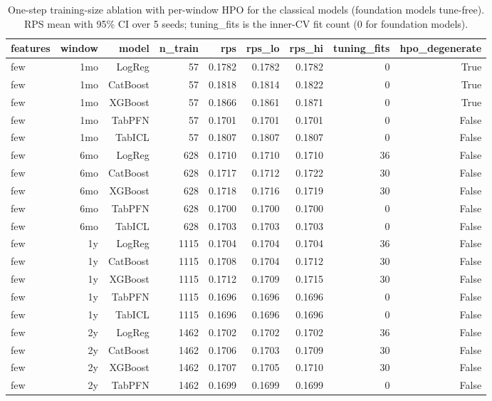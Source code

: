 \begin{table}[t]
  \centering
  \caption{One-step training-size ablation with per-window HPO for the classical models (foundation models tune-free). RPS mean with 95\% CI over 5 seeds; tuning\_fits is the inner-CV fit count (0 for foundation models).}
  \label{tab:ablation_onestep}
  \begin{tabular}{lrrrrrrrr}
  \toprule
  features & window & model & n\_train & rps & rps\_lo & rps\_hi & tuning\_fits & hpo\_degenerate \\
  \midrule
  few & 1mo & LogReg & 57 & 0.1782 & 0.1782 & 0.1782 & 0 & True \\
  few & 1mo & CatBoost & 57 & 0.1818 & 0.1814 & 0.1822 & 0 & True \\
  few & 1mo & XGBoost & 57 & 0.1866 & 0.1861 & 0.1871 & 0 & True \\
  few & 1mo & TabPFN & 57 & 0.1701 & 0.1701 & 0.1701 & 0 & False \\
  few & 1mo & TabICL & 57 & 0.1807 & 0.1807 & 0.1807 & 0 & False \\
  few & 6mo & LogReg & 628 & 0.1710 & 0.1710 & 0.1710 & 36 & False \\
  few & 6mo & CatBoost & 628 & 0.1717 & 0.1712 & 0.1722 & 30 & False \\
  few & 6mo & XGBoost & 628 & 0.1718 & 0.1716 & 0.1719 & 30 & False \\
  few & 6mo & TabPFN & 628 & 0.1700 & 0.1700 & 0.1700 & 0 & False \\
  few & 6mo & TabICL & 628 & 0.1703 & 0.1703 & 0.1703 & 0 & False \\
  few & 1y & LogReg & 1115 & 0.1704 & 0.1704 & 0.1704 & 36 & False \\
  few & 1y & CatBoost & 1115 & 0.1708 & 0.1704 & 0.1712 & 30 & False \\
  few & 1y & XGBoost & 1115 & 0.1712 & 0.1709 & 0.1715 & 30 & False \\
  few & 1y & TabPFN & 1115 & 0.1696 & 0.1696 & 0.1696 & 0 & False \\
  few & 1y & TabICL & 1115 & 0.1696 & 0.1696 & 0.1696 & 0 & False \\
  few & 2y & LogReg & 1462 & 0.1702 & 0.1702 & 0.1702 & 36 & False \\
  few & 2y & CatBoost & 1462 & 0.1706 & 0.1703 & 0.1709 & 30 & False \\
  few & 2y & XGBoost & 1462 & 0.1707 & 0.1705 & 0.1710 & 30 & False \\
  few & 2y & TabPFN & 1462 & 0.1699 & 0.1699 & 0.1699 & 0 & False \\

\end{tabular}
\end{table}
